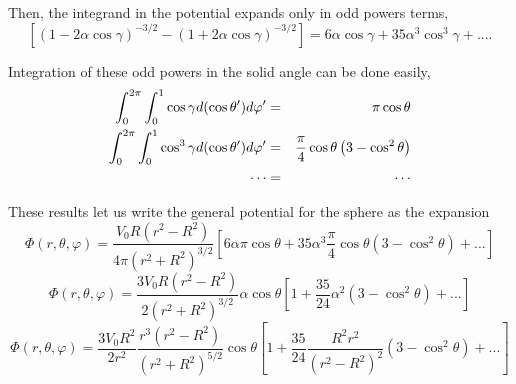 Then, the integrand in the potential expands only in odd powers terms,
\begin{equation}
\left[ \left( 1- 2 \alpha \cos \gamma \right)^{-3/2} -  \left(1+ 2 \alpha \cos \gamma \right)^{-3/2}  \right] =  6 \alpha \cos \gamma  + 35  \alpha ^3 \cos ^3 \gamma + ... . 
\end{equation}

Integration of these odd powers in the solid angle can be done easily,
\begin{eqnarray}
\int_0^{2\pi} \int_0^1 \cos \gamma d(\cos \theta ') d\varphi ' &=& \pi \cos \theta \\
\int_0^{2\pi} \int_0^1 \cos ^3 \gamma d(\cos \theta ') d\varphi ' &=& \frac{\pi}{4} \cos \theta \left( 3 - \cos ^2 \theta \right)\\
\cdots &=& \cdots \notag
\end{eqnarray}

These results let us write the general potential for the sphere as the expansion
\begin{equation}
\Phi (r, \theta, \varphi ) = \frac{V_0 R \left(  r^2- R^2 \right)}{4 \pi (r^2 + R^2)^{3/2}} \left[ 6 \alpha  \pi \cos \theta + 35  \alpha ^3 \frac{\pi}{4} \cos \theta \left( 3 - \cos ^2 \theta \right) + ... \right]
\end{equation}
\begin{equation}
\Phi (r, \theta, \varphi ) = \frac{3V_0 R \left(  r^2- R^2 \right)}{2 (r^2 + R^2)^{3/2}}  \alpha \cos \theta \left[  1 +  \frac{35}{24}  \alpha ^2 \left( 3 - \cos ^2 \theta \right) + ... \right]
\end{equation}
\begin{equation}
\Phi (r, \theta, \varphi ) = \frac{3V_0 R^2}{2 r^2}  \frac{r^3  \left(  r^2- R^2 \right)}{(r^2 + R^2)^{5/2}} \cos \theta \left[  1 +  \frac{35}{24}  \frac{R^2 r^2}{(r^2 - R^2)^2} \left( 3 - \cos ^2 \theta \right) + ... \right]
\end{equation}


